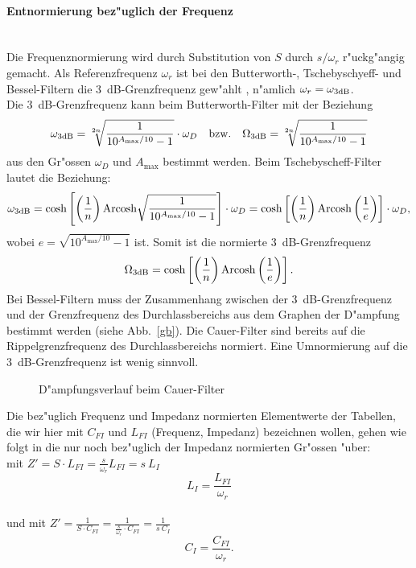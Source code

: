 \paragraph{Entnormierung bez"uglich der Frequenz}~\\
Die Frequenznormierung wird durch Substitution von $S$ durch
$s/\omega_r$ r"uckg"angig gemacht.
Als Referenzfrequenz $\omega_r$ ist bei den Butterworth-,
Tschebyschyeff- und Bessel-Filtern die 3~dB-Grenzfrequenz gew"ahlt \cite{ZVE:67}, n"amlich $\omega_r=\omega_{3{\rm dB}}$.\\
\nit Die 3~dB-Grenzfrequenz kann beim Butterworth-Filter mit der Beziehung
\begin{equation}
\omega_{3{\rm dB}}=\sqrt[2n]{\frac{1}{10^{A_{\max}/10}-1}} 
\cdot \omega_D \quad \text{bzw.} \quad 
\Omega_{3{\rm dB}}=\sqrt[2n]{\frac{1}{10^{A_{\max}/10}-1}} 
\end{equation}
aus den Gr"ossen $\omega_D$ und $A_{\max}$ bestimmt werden.
Beim Tschebyscheff-Filter lautet die Beziehung:
\begin{equation*}
\omega_{3{\rm dB}}=\cosh \left[ \left(\frac{1}{n}\right) {\rm Arcosh}
   \sqrt{\frac{1}{10^{A_{\max}/10}-1}} \right] 
   \cdot \omega_D=\cosh \left[ \left(\frac{1}{n}\right) {\rm Arcosh} \left(\frac{1}{e}\right) \right] 
   \cdot \omega_D,
\end{equation*}
wobei $e=\sqrt{10^{A_{\max}/10}-1}$ ist. Somit ist die normierte 3~dB-Grenzfrequenz
\begin{equation}
\Omega_{3{\rm dB}}=\cosh \left[ \left(\frac{1}{n}\right) {\rm Arcosh} \left(\frac{1}{e}\right) \right]. 
\label{eq-o3db}
\end{equation}
Bei Bessel-Filtern muss der Zusammenhang zwischen der
3~dB-Grenzfrequenz und der Grenzfrequenz des
Durchlassbereichs aus dem Graphen der D"ampfung bestimmt werden (siehe
Abb.~\ref{gb}). Die Cauer-Filter sind bereits auf die
Rippelgrenzfrequenz des Durchlassbereichs
normiert. Eine Umnormierung auf die 3~dB-Grenzfrequenz ist wenig
sinnvoll.
\begin{figure}[!htb]
\vspace*{-3mm}
\begin{center}
  \caption{D"ampfungsverlauf beim Cauer-Filter}
\end{center}
\vspace*{-6mm}
\end{figure}
Die bez"uglich Frequenz und Impedanz normierten Elementwerte der Tabellen,
die wir hier mit $C_{FI}$ und $L_{FI}$ (Frequenz, Impedanz) bezeichnen wollen,
gehen wie folgt in die nur noch bez"uglich der Impedanz normierten
Gr"ossen "uber:\\
\nit mit $ Z'=S \cdot L_{FI}=\displaystyle\frac{s}{\omega_r} L_{FI}=s ~L_I $
\begin{equation*}
L_I=\frac{L_{FI}}{\omega_r}
\end{equation*}\\
\nit und mit $ Z'=\displaystyle\frac{1}{S \cdot C_{FI}}
=\displaystyle\frac{1}{\displaystyle\frac{s}{\omega_r} \cdot C_{FI}}=
\displaystyle\frac{1}{s ~C_I}$
\begin{equation*}
C_I=\frac{C_{FI}}{\omega_r}.
\end{equation*}
